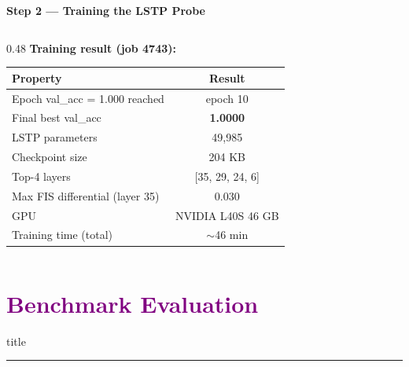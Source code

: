 \documentclass[aspectratio=169]{beamer}
\begin{document}
\begin{frame}{\textcolor{cmindsblue}{\textbf{Step 2 — Training the LSTP Probe}}}
\begin{columns}[T]
    \begin{column}{0.48\textwidth}
      \textcolor{cmindsblue}{\textbf{Training result (job 4743):}}\\[4pt]
      {\scriptsize
      \begin{tabular}{lc}
        \toprule
        Property & Result \\
        \midrule
        Epoch val\_acc = 1.000 reached & epoch 10 \\
        Final best val\_acc & \textbf{1.0000} \\
        LSTP parameters & 49,985 \\
        Checkpoint size & 204 KB \\
        Top-4 layers & [35, 29, 24, 6] \\
        Max FIS differential (layer 35) & 0.030 \\
        GPU & NVIDIA L40S 46 GB \\
        Training time (total) & $\sim$46 min \\
        \bottomrule
      \end{tabular}
      }
    \end{column}
  \end{columns}
\end{frame}


\section{\textbf{\textcolor{purple}{Benchmark Evaluation}}}
\begin{frame}[plain]\vfill\centering
  \begin{beamercolorbox}[sep=8pt,center,shadow=true,rounded=true]{title}
    \insertsectionhead\par
    \color{oxfordblue}\noindent\rule{10cm}{1pt}
  \end{beamercolorbox}\vfill
\end{frame}
\end{document}
